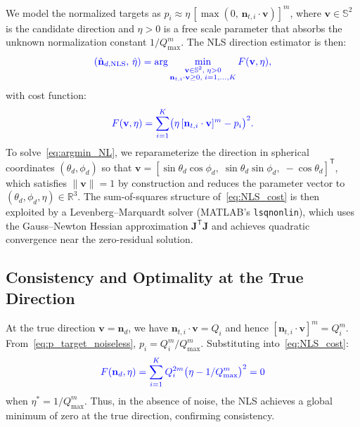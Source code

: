 \documentclass[journal]{IEEEtran}
\newcommand{\added}[1]{{\color{blue}#1}}
\begin{document}
\added{We model the normalized targets as $p_i \approx \eta\,[\max(0,\,\mathbf{n}_{t,i}\cdot\mathbf{v})]^m$, where $\mathbf{v}\in\mathbb{S}^2$ is the candidate direction and $\eta>0$ is a free scale parameter that absorbs the unknown normalization constant $1/Q_{\max}^m$. The NLS direction estimator is then:}
\begin{equation}
\added{(\hat{\mathbf{n}}_{d,\mathrm{NLS}},\,\hat\eta) = \arg\min_{\substack{\mathbf{v}\in\mathbb{S}^2,\;\eta>0 \\ \mathbf{n}_{t,i}\cdot\mathbf{v}\ge0,\;i=1,\ldots,K}} F(\mathbf{v},\eta),}
\label{eq:argmin_NL}
\end{equation}
\added{with cost function:}
\begin{equation}
\added{F(\mathbf{v},\eta) = \sum_{i=1}^{K}\bigl(\eta\,[\mathbf{n}_{t,i}\cdot\mathbf{v}]^m - p_i\bigr)^2.}
\label{eq:NLS_cost}
\end{equation}
\added{To solve~\eqref{eq:argmin_NL}, we reparameterize the direction in spherical coordinates $(\theta_d,\phi_d)$ so that $\mathbf{v}=[\sin\theta_d\cos\phi_d,\;\sin\theta_d\sin\phi_d,\;-\cos\theta_d]^{\mathsf T}$, which satisfies $\lVert\mathbf{v}\rVert=1$ by construction and reduces the parameter vector to $(\theta_d,\phi_d,\eta)\in\mathbb{R}^3$. The sum-of-squares structure of~\eqref{eq:NLS_cost} is then exploited by a Levenberg--Marquardt solver (MATLAB's \texttt{lsqnonlin}), which uses the Gauss--Newton Hessian approximation $\mathbf{J}^{\mathsf T}\mathbf{J}$ and achieves quadratic convergence near the zero-residual solution.}

\added{\subsection{Consistency and Optimality at the True Direction}}
\added{At the true direction $\mathbf{v}=\mathbf{n}_d$, we have $\mathbf{n}_{t,i}\cdot\mathbf{v}=Q_i$ and hence $[\mathbf{n}_{t,i}\cdot\mathbf{v}]^m=Q_i^m$. From~\eqref{eq:p_target_noiseless}, $p_i=Q_i^m/Q_{\max}^m$. Substituting into~\eqref{eq:NLS_cost}:}
\begin{equation}
\added{F(\mathbf{n}_d,\eta)=\sum_{i=1}^K Q_i^{2m}\bigl(\eta - 1/Q_{\max}^m\bigr)^2 = 0}
\end{equation}
\added{when $\eta^*=1/Q_{\max}^m$. Thus, in the absence of noise, the NLS achieves a global minimum of zero at the true direction, confirming consistency.}
\end{document}
